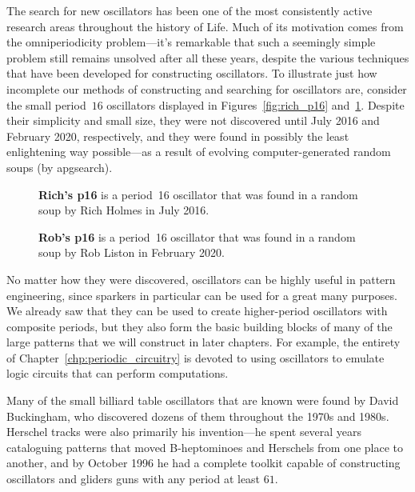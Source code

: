 The search for new oscillators has been one of the most consistently active research areas throughout the history of Life. Much of its motivation comes from the omniperiodicity problem---it's remarkable that such a seemingly simple problem still remains unsolved after all these years, despite the various techniques that have been developed for constructing oscillators. To illustrate just how incomplete our methods of constructing and searching for oscillators are, consider the small period~$16$ oscillators displayed in Figures~\ref{fig:rich_p16} and~\ref{fig:rob_p16}. Despite their simplicity and small size, they were not discovered until July 2016 and February 2020, respectively, and they were found in possibly the least enlightening way possible---as a result of evolving computer-generated random soups (by apgsearch).

\begin{figure}[!htb]
	\centering
	\begin{minipage}[b]{.48\textwidth}
		\centering
		\caption{\textbf{Rich's p16} is a period~16 oscillator that was found in a random soup by Rich Holmes in July 2016.}\label{fig:rich_p16}
	\end{minipage} \hfill %
	\begin{minipage}[b]{.48\textwidth}
		\centering
		\caption{\textbf{Rob's p16} is a period~16 oscillator that was found in a random soup by Rob Liston in February 2020.}\label{fig:rob_p16}
	\end{minipage}
\end{figure}

No matter how they were discovered, oscillators can be highly useful in pattern engineering, since sparkers in particular can be used for a great many purposes. We already saw that they can be used to create higher-period oscillators with composite periods, but they also form the basic building blocks of many of the large patterns that we will construct in later chapters. For example, the entirety of Chapter~\ref{chp:periodic_circuitry} is devoted to using oscillators to emulate logic circuits that can perform computations.

Many of the small billiard table oscillators that are known were found by David Buckingham, who discovered dozens of them throughout the 1970s and 1980s. Herschel tracks were also primarily his invention---he spent several years cataloguing patterns that moved B-heptominoes and Herschels from one place to another, and by October 1996 he had a complete toolkit capable of constructing oscillators and gliders guns with any period at least $61$.

